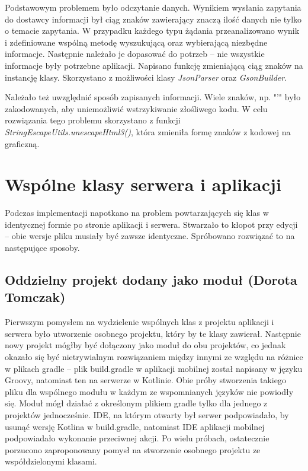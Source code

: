 \documentclass[10pt,twoside,a4paper]{report}
\begin{document}
\par Podstawowym problemem było odczytanie danych. Wynikiem wysłania zapytania do dostawcy informacji był ciąg znaków zawierający znaczą ilość danych nie tylko o temacie zapytania. W przypadku każdego typu żądania przeanalizowano wynik i zdefiniowane wspólną metodę wyszukującą oraz wybierającą niezbędne informacje. Następnie należało je dopasować do potrzeb -- nie wszystkie informacje były potrzebne aplikacji. Napisano funkcję zmieniającą ciąg znaków na instancję klasy. Skorzystano z możliwości klasy \textit{JsonParser}\cite{JsonParser} oraz \textit{GsonBuilder}\cite{GsonBuilder}.

\par Należało też uwzględnić sposób zapisanych informacji. Wiele znaków, np. "'" było zakodowanych, aby uniemożliwić wstrzykiwanie złośliwego kodu. W celu rozwiązania tego problemu skorzystano z funkcji \textit{StringEscapeUtils.unescapeHtml3()}\cite{escapeUtils}, która zmieniła formę znaków z kodowej na graficzną.

\section{Wspólne klasy serwera i aplikacji}
\par Podczas implementacji napotkano na problem powtarzających się klas w identycznej formie po stronie aplikacji i serwera. Stwarzało to kłopot przy edycji -- obie wersje pliku musiały być zawsze identyczne. Spróbowano rozwiązać to na następujące sposoby.

\subsection{Oddzielny projekt dodany jako moduł (Dorota Tomczak)}
\par Pierwszym pomysłem na wydzielenie wspólnych klas z projektu aplikacji i serwera było utworzenie osobnego projektu, który by te klasy zawierał. Następnie nowy projekt mógłby być dołączony jako moduł do obu projektów, co jednak okazało się być nietrywialnym rozwiązaniem między innymi ze względu na różnice w plikach gradle -- plik build.gradle w aplikacji mobilnej został napisany w języku Groovy, natomiast ten na serwerze w Kotlinie. Obie próby stworzenia takiego pliku dla wspólnego modułu w każdym ze wspomnianych języków nie powiodły się. Moduł mógł działać z określonym plikiem gradle tylko dla jednego z projektów jednocześnie. IDE, na którym otwarty był serwer podpowiadało, by usunąć wersję Kotlina w build.gradle, natomiast IDE aplikacji mobilnej podpowiadało wykonanie przeciwnej akcji. Po wielu próbach, ostatecznie porzucono zaproponowany pomysł na stworzenie osobnego projektu ze współdzielonymi klasami.
\end{document}
